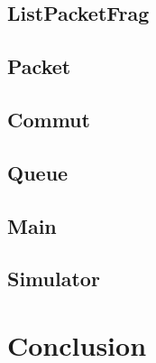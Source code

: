 \documentclass{beamer}
\newcommand{\FSource}[1]{%
  
  }
\begin{document}
\frame{\FSource{sources/packetfrag.h}}

\subsection{ListPacketFrag}

\frame{\FSource{sources/listpacketfrag.h}}

\subsection{Packet}

\frame{\FSource{sources/packet.h}}

\subsection{Commut}

\frame{\FSource{sources/commut.h}}

\subsection{Queue}

\frame{\FSource{sources/queue.h}}

\subsection{Main}

\frame{\FSource{sources/main.c}}

\subsection{Simulator}

\frame{\FSource{sources/simulator.c}}
\frame{\FSource{sources/in.c}}
\frame{\FSource{sources/out.c}}

\section{Conclusion}
\end{document}
